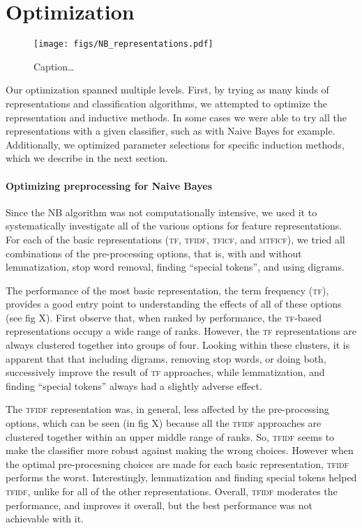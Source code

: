 \documentclass[conference,letterpaper]{IEEEtran}
\begin{document}
\section{Optimization}
\begin{figure*}
	\centering
	\texttt{[image: figs/NB\_representations.pdf]}
	\caption{Caption\dots}
	\label{fig:NB_representations}
\end{figure*}
Our optimization spanned multiple levels.  First, by trying as many kinds
of representations and classification algorithms, we attempted to optimize 
the representation and inductive methods.  In some cases we were able to try
all the representations with a given classifier, such as with Naive Bayes for 
example.  Additionally, we optimized parameter selections for specific
induction methods, which we describe in the next section.

\paragraph*{Optimizing preprocessing for Naive Bayes}
Since the \textsc{NB} algorithm was not 
computationally intensive, we used it to systematically investigate all of the
various options for feature representations.  For each of the basic 
representations (\textsc{tf}, \textsc{tfidf}, \textsc{tficf}, and 
\textsc{mtficf}), we tried all combinations of the pre-processing options, 
that is, with and without lemmatization, stop word removal, finding ``special 
tokens'', and using digrams.

The performance of the most basic representation, the term frequency 
(\textsc{tf}), provides a good entry point to understanding the effects
of all of these options (see fig X).  First observe that, when ranked by 
performance, the \textsc{tf}-based representations occupy a wide range of 
ranks.  However, the \textsc{tf} representations are always clustered together
into groups of four.  Looking within these clusters, it is apparent that
that including digrams, removing stop words,
or doing both, successively improve the result of \textsc{tf} approaches,
while lemmatization, and finding ``special tokens'' always had a slightly
adverse effect.

The \textsc{tfidf} representation was, in general, less affected by the
pre-processing options, which can be seen (in fig X) because all the
\textsc{tfidf} approaches are clustered together within an upper middle 
range of ranks.  So, \textsc{tfidf} seems to make the classifier more robust
against making the wrong choices.  However when the optimal pre-procesning 
choices are made for each basic representation, \textsc{tfidf} performs
the worst.  Interestingly, lemmatization and finding special tokens helped
\textsc{tfidf}, unlike for all of the other representations.  
Overall, \textsc{tfidf} moderates the performance, and improves it
overall, but the best performance was not achievable with it.
\end{document}
